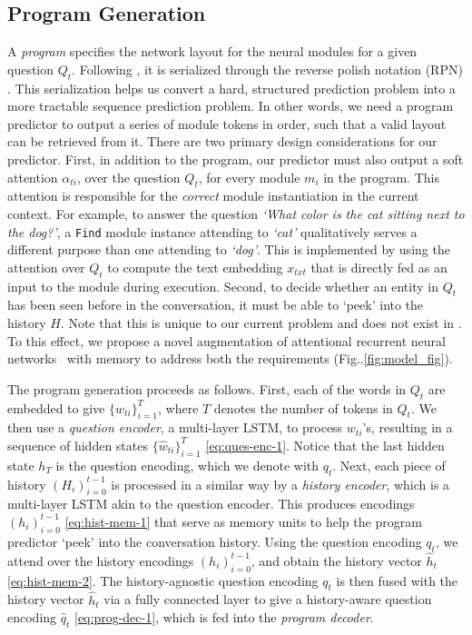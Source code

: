\documentclass[runningheads]{llncs}
\makeatletter
\DeclareRobustCommand\onedot{\futurelet\@let@token\@onedot}
\def\@onedot{\ifx\@let@token.\else.\null\fi\xspace}
\def\Fig{Fig\onedot}
\makeatother
\begin{document}
\subsection{Program Generation}
\label{sec:prog_predict}
A \textit{program} specifies the network layout for the neural modules 
for a given question $Q_t$.
Following \cite{hu2017learning}, it is serialized through the reverse 
polish notation (RPN) \cite{10.2307/2001990}.
This serialization helps us convert a hard, structured prediction problem into
a more tractable sequence prediction problem.
In other words, we need a program predictor to output a series of module
tokens in order, such that a valid layout can be retrieved from it.
There are two primary design considerations for our predictor.
First, in addition to the program, our predictor must also output a
soft attention $\alpha_{ti}$, over the question $Q_t$, for every module 
$m_i$ in the program.
This attention is responsible for the \emph{correct} module instantiation
in the current context.
For example, to answer the question \textit{`What color is the cat sitting next
to the dog?'}, a \texttt{Find} module instance attending to \textit{`cat'}
qualitatively serves a different purpose than one attending to \textit{`dog'}.
This is implemented by using the attention over $Q_t$ to compute the text 
embedding $x_{txt}$ that is directly fed as an input to the module during 
execution.
Second, to decide whether an entity in $Q_t$ has been seen before in the
conversation, it must be able to `peek' into the history $H$.
Note that this is unique to our current problem and does not exist in \cite{hu2017learning}.
To this effect, we propose a novel augmentation of attentional recurrent neural 
networks~\cite{bahdanau_iclr15} with memory \cite{DBLP:journals/corr/WestonCB14}
to address both the requirements (\Fig\ref{fig:model_fig}).

The program generation proceeds as follows.
First, each of the words in $Q_t$ are embedded to give $\{w_{ti}\}_{i=1}^T$,
where $T$ denotes the number of tokens in $Q_t$.
We then use a \textit{question encoder}, a multi-layer LSTM, to process
$w_{ti}$'s, resulting in a sequence of hidden states $\{\hat{w}_{ti}\}_{i=1}^T$
\eqref{eq:ques-enc-1}.
Notice that the last hidden state $h_T$ is the question encoding, which we
denote with $q_t$.
Next, each piece of history $(H_i)_{i=0}^{t-1}$ is processed in a similar
way by a \textit{history encoder}, which is a multi-layer LSTM akin to the
question encoder.
This produces encodings $(h_i)_{i=0}^{t-1}$ \eqref{eq:hist-mem-1} that serve 
as memory units to help the program predictor `peek' into the conversation
history.
Using the question encoding $q_t$, we attend over the history encodings 
$(h_i)_{i=0}^{t-1}$, and obtain the history vector $\hat{h}_t$ 
\eqref{eq:hist-mem-2}.
The history-agnostic question encoding $q_t$ is then fused with the history 
vector $\hat{h}_t$ via a fully connected layer to give a history-aware
question encoding $\hat{q}_t$ \eqref{eq:prog-dec-1}, which is fed into the \textit{program decoder}.
\end{document}
